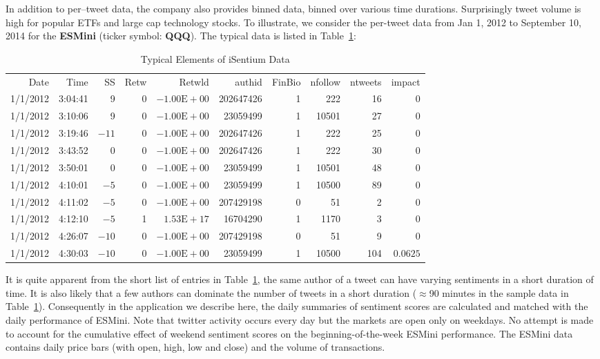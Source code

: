 In addition to per--tweet data, the company also provides binned data, binned over various time durations. Surprisingly tweet volume is high for popular ETFs and large cap technology stocks. To illustrate, we consider the per-tweet data from Jan 1, 2012 to September 10, 2014 for the \textbf{ESMini} (ticker symbol: \textbf{QQQ}). The typical data is listed in Table~\ref{tab:isentiumdata}:

\begin{table}[!ht]
\centering
\caption{Typical Elements of iSentium Data \label{tab:isentiumdata}}
\hspace*{-1.8cm}
\begin{tabular}{rrrrrrrrrr}
Date & Time & SS & Retw & Retwld & authid & FinBio & nfollow & ntweets & impact \\
1/1/2012 & 3:04:41 & 9 & 0 & $-1.00\text{E}+00$ & 202647426 & 1 & 222 & 16 & 0 \\
1/1/2012 & 3:10:06 & 9 & 0 & $-1.00\text{E}+00$ & 23059499 & 1 & 10501 & 27 & 0 \\
1/1/2012 & 3:19:46 & $-11$ & 0 & $-1.00\text{E}+00$ & 202647426 & 1 & 222 & 25 & 0 \\
1/1/2012 & 3:43:52 & 0 & 0 & $-1.00\text{E}+00$ & 202647426 & 1 & 222 & 30 & 0 \\
1/1/2012 & 3:50:01 & 0 & 0 & $-1.00\text{E}+00$ & 23059499 & 1 & 10501 & 48 & 0 \\
1/1/2012 & 4:10:01 & $-5$ & 0 & $-1.00\text{E}+00$ & 23059499 & 1 & 10500 & 89 & 0 \\
1/1/2012 & 4:11:02 &  $-5$ & 0 & $-1.00\text{E}+00$ & 207429198 & 0 & 51 & 2 & 0 \\
1/1/2012 & 4:12:10 &  $-5$ & 1 & $1.53\text{E}+17$ & 16704290 & 1& 1170 & 3 & 0 \\
1/1/2012 & 4:26:07 & $-10$ & 0 & $-1.00\text{E}+00$ & 207429198 & 0 & 51 & 9 & 0 \\
1/1/2012 & 4:30:03 & $-10$ & 0 & $-1.00\text{E}+00$ & 23059499 &	1 & 10500	 & 104 & $0.0625$ 
\end{tabular}
\end{table}

It is quite apparent from the short list of entries in Table~\ref{tab:isentiumdata}, the same author of a tweet can have varying sentiments in a short duration of time. It is also likely that a few authors can dominate the number of tweets in a short duration ($\approx$90 minutes in the sample data in Table~\ref{tab:isentiumdata}). Consequently in the application we describe here, the daily summaries of sentiment scores are calculated and matched with the daily performance of ESMini. Note that twitter activity occurs every day but the markets are open only on weekdays. No attempt is made to account for the cumulative effect of weekend sentiment scores on the beginning-of-the-week ESMini performance. The ESMini data contains daily price bars (with open, high, low and close) and the volume of transactions.


